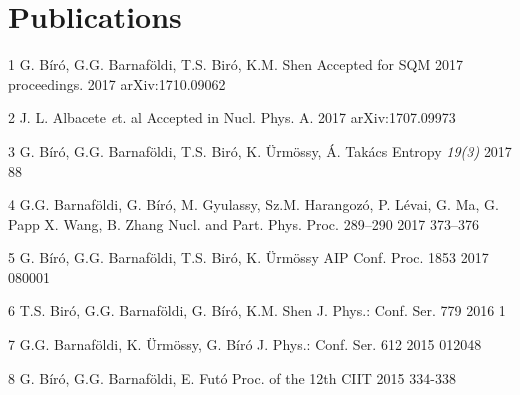 \documentclass{tccv}
\begin{document}
%
%
%

\section{Publications}

\begin{publicationlist}


\item{1}
    {G. Bíró, G.G. Barnaföldi, T.S. Biró,  K.M. Shen}
    {}%
    {Accepted for SQM 2017 proceedings.}
    {2017}
    {arXiv:1710.09062}


\item{2}
    {J. L. Albacete {\textit et. al}}
    {}%
    {Accepted in Nucl. Phys. A.}
    {2017}
    {arXiv:1707.09973}

\item{3}
     {G. Bíró, G.G. Barnaföldi, T.S. Biró, K. Ürmössy, Á. Takács}
     {}%
     {Entropy \textit{19(3)}}
     {2017}
     {88}

\item{4}
     {G.G. Barnaföldi, G. Bíró, M. Gyulassy, Sz.M. Harangozó, P. Lévai, G. Ma, G. Papp X. Wang, B. Zhang}
     {}%
     {Nucl. and Part. Phys. Proc. 289–290}
     {2017}
     {373–376}

\item{5}
     {G. Bíró, G.G. Barnaföldi, T.S. Biró, K. Ürmössy}
     {}%
     {AIP Conf. Proc. 1853}
     {2017}
     {080001}

\item{6}
     {T.S. Biró, G.G. Barnaföldi, G. Bíró, K.M. Shen}
     {}%
     {J. Phys.: Conf. Ser. 779}
     {2016}
     {1}

\item{7}
     {G.G. Barnaföldi, K. Ürmössy, G. Bíró}
     {}%
     {J. Phys.: Conf. Ser. 612}
     {2015}
     {012048}

\item{8}
     {G. Bíró, G.G. Barnaföldi, E. Futó}
     {}%
     {Proc. of the 12th CIIT}
     {2015}
     {334-338}

\end{publicationlist}
\end{document}
